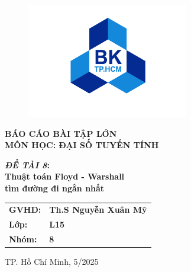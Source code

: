 \begin{titlepage}
    \vspace{0.5cm}

    \begin{figure}[h!]
        \begin{center}
            \includegraphics[height=5cm]{cover_pages/01_logobachkhoasang.png}
        \end{center}
    \end{figure}
    \vspace{1cm}
    \begin{center}
        {\fontsize{18pt}{24pt}\selectfont \textbf{BÁO CÁO BÀI TẬP LỚN}}\\
        {\fontsize{18pt}{24pt}\selectfont \textbf{MÔN HỌC: ĐẠI SỐ TUYẾN TÍNH}}\\
    \end{center}
    \begin{center}
        \vspace{0.5cm}
        {\fontsize{18pt}{24pt}\selectfont \textbf{\textit{ĐỀ TÀI 8}:}}\\
        \vspace{0.3cm}
        \textbf{{\fontsize{18pt}{24pt}\selectfont Thuật toán Floyd - Warshall \\ tìm đường đi ngắn nhất
                }}\\
        \vspace{0.5cm}
    \end{center}

    \hspace{2cm}
    \begin{minipage}{0.8\textwidth} %
        \vspace{0.5cm}
        \begin{tabular}{ll}
            {\fontsize{16pt}{24pt}\selectfont \textbf{GVHD:}} & {\fontsize{16pt}{24pt}\selectfont \textbf{Th.S Nguyễn Xuân Mỹ}} \\
            {\fontsize{16pt}{24pt}\selectfont \textbf{Lớp:}}  & {\fontsize{16pt}{24pt}\selectfont \textbf{L15}}                 \\
            {\fontsize{16pt}{24pt}\selectfont \textbf{Nhóm:}} & {\fontsize{16pt}{24pt}\selectfont \textbf{8}}                   \\
        \end{tabular}
    \end{minipage}


    \vspace{2.7cm}
    \centerline{\Large TP. Hồ Chí Minh, 5/2025}
\end{titlepage}
